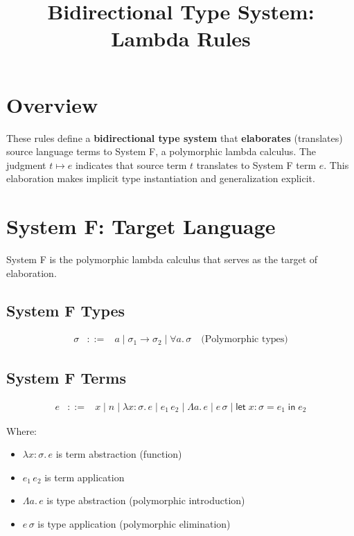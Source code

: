 \documentclass[11pt,a4paper]{article}
\begin{document}
\title{Bidirectional Type System: Lambda Rules}
\date{}
\maketitle

\section{Overview}

These rules define a \textbf{bidirectional type system} that \textbf{elaborates} (translates) source language terms to System F, a polymorphic lambda calculus. The judgment $t \mapsto e$ indicates that source term $t$ translates to System F term $e$. This elaboration makes implicit type instantiation and generalization explicit.

\section{System F: Target Language}

System F is the polymorphic lambda calculus that serves as the target of elaboration.

\subsection{System F Types}
\[
\begin{array}{rcl}
\sigma & ::= & a \mid \sigma_1 \rightarrow \sigma_2 \mid \forall a.\,\sigma \quad \text{(Polymorphic types)}
\end{array}
\]

\subsection{System F Terms}
\[
\begin{array}{rcl}
e & ::= & x \mid n \mid \lambda x:\sigma.\,e \mid e_1\,e_2 \mid \Lambda a.\,e \mid e\,\sigma \mid \textsf{let}\;x:\sigma = e_1\;\textsf{in}\;e_2
\end{array}
\]

Where:
\begin{itemize}
\item $\lambda x:\sigma.\,e$ is term abstraction (function)
\item $e_1\,e_2$ is term application
\item $\Lambda a.\,e$ is type abstraction (polymorphic introduction)
\item $e\,\sigma$ is type application (polymorphic elimination)
\end{itemize}
\end{document}
